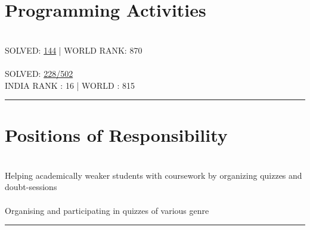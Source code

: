 \documentclass[letterpaper]{Formatting}
\begin{document}
\begin{minipage}[t]{0.3\textwidth}

\section{Programming Activities}
\\\vspace{0.5ex}
\small\uppercase {Solved: }\href{http://www.spoj.com/users/rbavishi/}{144} | \uppercase{World Rank: 870}\\
\vspace{2ex}
\\\vspace{0.5ex}
\small \uppercase{Solved: }\href{https://projecteuler.net/profile/RJBavishi.png}{228/502} \\
\small \uppercase{India Rank : 16 | World : 815}
\vspace{1ex}
\rule{5cm}{0.5pt}
\vspace{2ex}


\section{Positions of Responsibility}
\\
\vspace{1ex}
\footnotesize \textbullet{} Helping academically weaker students with coursework by organizing quizzes and doubt-sessions\\
\vspace{3ex}
\\
\vspace{1ex}
\footnotesize \textbullet{} Organising and participating in quizzes of various genre\\
\vspace{1ex}
\rule{5cm}{0.5pt}
\end{minipage} %
\hfill
\vrule
\hspace{3ex}
%
\end{document}

